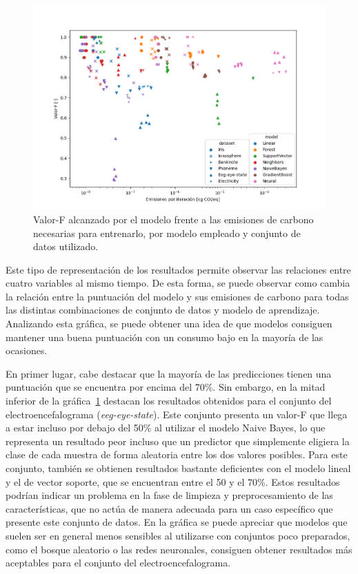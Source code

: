 \begin{figure}[H]
  \centerline{
     \includegraphics[width=1.2\textwidth, keepaspectratio]{img/graph/4-1-scatter-fitem-fscore.png}
  }
  \caption{Valor-F alcanzado por el modelo frente a las emisiones de carbono necesarias para entrenarlo, por modelo empleado y conjunto de datos utilizado.}
  \label{fig:scatter-1}
\end{figure}

Este tipo de representación de los resultados permite observar las relaciones entre cuatro variables al mismo tiempo. De esta forma, se puede observar como cambia la relación entre la puntuación del modelo y sus emisiones de carbono para todas las distintas combinaciones de conjunto de datos y modelo de aprendizaje. Analizando esta gráfica, se puede obtener una idea de que modelos consiguen mantener una buena puntuación con un consumo bajo en la mayoría de las ocasiones.

En primer lugar, cabe destacar que la mayoría de las predicciones tienen una puntuación que se encuentra por encima del 70\%. Sin embargo, en la mitad inferior de la gráfica~\ref{fig:scatter-1} destacan los resultados obtenidos para el conjunto del electroencefalograma (\emph{eeg-eye-state}). Este conjunto presenta un valor-F que llega a estar incluso por debajo del 50\% al utilizar el modelo Naive Bayes, lo que representa un resultado peor incluso que un predictor que simplemente eligiera la clase de cada muestra de forma aleatoria entre los dos valores posibles. Para este conjunto, también se obtienen resultados bastante deficientes con el modelo lineal y el de vector soporte, que se encuentran entre el 50 y el 70\%. Estos resultados podrían indicar un problema en la fase de limpieza y preprocesamiento de las características, que no actúa de manera adecuada para un caso específico que presente este conjunto de datos. En la gráfica se puede apreciar que modelos que suelen ser en general menos sensibles al utilizarse con conjuntos poco preparados, como el bosque aleatorio o las redes neuronales, consiguen obtener resultados más aceptables para el conjunto del electroencefalograma.

